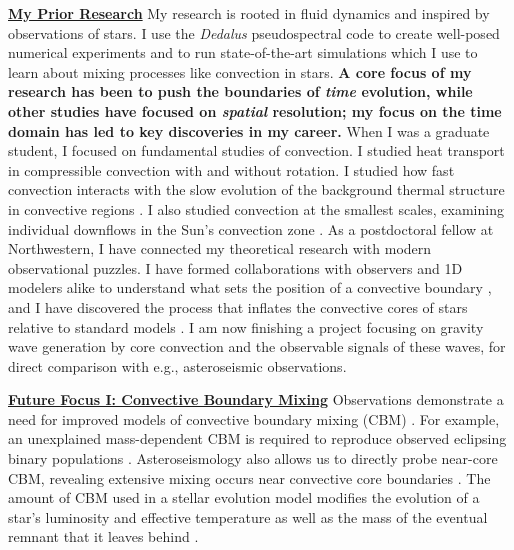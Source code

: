 \documentclass[12pt]{article}
\newcommand{\sct}[1]{\vspace{0.3cm}\hspace{-\parindent}\textbf{\underline{#1}}\hspace{0.3cm}}
\begin{document}
\sct{My Prior Research}
My research is rooted in fluid dynamics and inspired by observations of stars.
I use the \emph{Dedalus} \citep{burns_etal_2020} pseudospectral code to create well-posed numerical experiments and to run state-of-the-art simulations which I use to learn about mixing processes like convection in stars.
\textbf{A core focus of my research has been to push the boundaries of \emph{time} evolution, while other studies have focused on \emph{spatial} resolution; my focus on the time domain has led to key discoveries in my career.}
When I was a graduate student, I focused on fundamental studies of convection.
I studied heat transport in compressible convection with  \citep{anders_etal_2019_rot} and without \citep{anders_brown_2017} rotation.
I studied how fast convection interacts with the slow evolution of the background thermal structure in convective regions \citep{anders_etal_2018,anders_etal_2020}.
I also studied convection at the smallest scales, examining individual downflows in the Sun's convection zone \cite{anders_etal_2019_thermals}.
As a postdoctoral fellow at Northwestern, I have connected my theoretical research with modern observational puzzles.
I have formed collaborations with observers and 1D modelers alike to understand what sets the position of a convective boundary \citep{anders_etal_2022b}, and I have discovered the process that inflates the convective cores of stars relative to standard models \citep{anders_etal_2022a}.
I am now finishing a project focusing on gravity wave generation by core convection and the observable signals of these waves, for direct comparison with e.g., asteroseismic observations.


\vspace{0.1cm}
\sct{Future Focus I: Convective Boundary Mixing}
Observations demonstrate a need for improved models of convective boundary mixing (CBM) \citep{johnston2021}.
For example, an unexplained mass-dependent CBM is required to reproduce observed eclipsing binary populations  \citep{claret_torres_2019}.
Asteroseismology also allows us to directly probe near-core CBM, revealing extensive mixing occurs near convective core boundaries \citep{michielsen_etal_2019, pedersen_etal_2021}.
The amount of CBM used in a stellar evolution model modifies the evolution of a star's luminosity and effective temperature as well as the mass of the eventual remnant that it leaves behind \citep{castro_etal_2014,higgins_vink_2019}.
\end{document}
